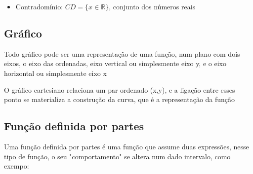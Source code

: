 \begin{multicols*}{2}
\begin{itemize}
        \item Contradomínio: $CD = \{x \in \mathbb{R} \}$, conjunto dos números reais
    \end{itemize}

    \subsection{Gráfico}
    Todo gráfico pode ser uma representação de uma função, num plano com dois eixos, o eixo das 			ordenadas, eixo vertical ou simplesmente eixo y, e o eixo horizontal ou simplesmente eixo x

    O gráfico cartesiano relaciona um par ordenado (x,y), e a ligação entre esses ponto se 					materializa a construção da curva, que é a representação da função




    \subsection{Função definida por partes}
    Uma função definida por partes é uma função que assume duas expressões, nesse tipo de função, o 		seu "comportamento" se altera num dado intervalo, como exempo:


\end{multicols*}
